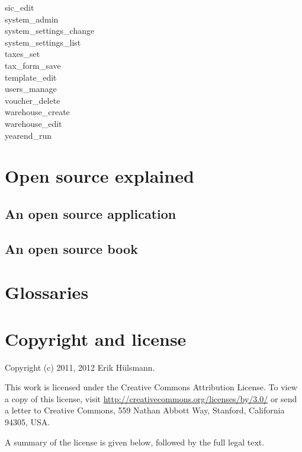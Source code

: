 \begin{description}
\item [sic\_edit]
\item [system\_admin]
\item [system\_settings\_change]
\item [system\_settings\_list]
\item [taxes\_set]
\item [tax\_form\_save]
\item [template\_edit]
\item [users\_manage]
\item [voucher\_delete]
\item [warehouse\_create]
\item [warehouse\_edit]
\item [yearend\_run]
\end{description}

\chapter{Open source explained}

\section{An open source application}

\section{An open source book}

\chapter{Glossaries}

\printglossary[type=acronym]


\chapter{Copyright and license}

Copyright (c) 2011, 2012 Erik H\"ulsmann.


This work is licensed under the Creative Commons Attribution License.
To view a copy of this license, visit \url{http://creativecommons.org/licenses/by/3.0/}
or send a letter to Creative Commons, 559 Nathan Abbott Way,
Stanford, California 94305, USA.

A summary of the license is given below, followed by the full legal text.

